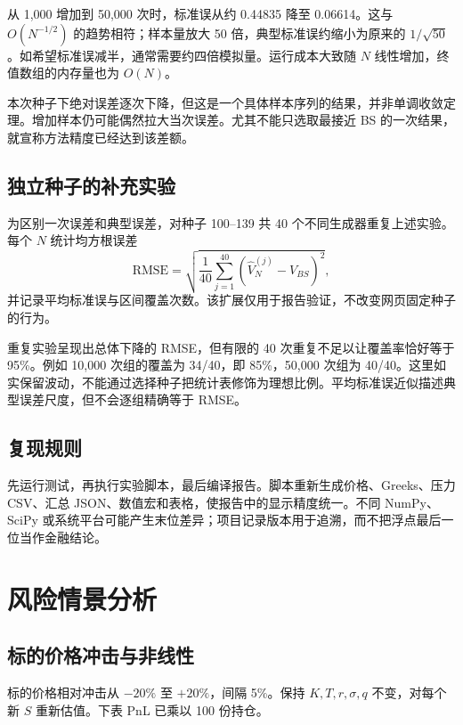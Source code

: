 \documentclass[UTF8,a4paper,12pt]{ctexart}
\begin{document}
\begin{table}[H]\centering\small

\caption{固定种子下的模拟次数比较}
\end{table}

从 1,000 增加到 50,000 次时，标准误从约 0.44835 降至 0.06614。这与 $O(N^{-1/2})$ 的趋势相符；样本量放大 50 倍，典型标准误约缩小为原来的 $1/\sqrt{50}$。如希望标准误减半，通常需要约四倍模拟量。运行成本大致随 $N$ 线性增加，终值数组的内存量也为 $O(N)$。

本次种子下绝对误差逐次下降，但这是一个具体样本序列的结果，并非单调收敛定理。增加样本仍可能偶然拉大当次误差。尤其不能只选取最接近 BS 的一次结果，就宣称方法精度已经达到该差额。

\subsection{独立种子的补充实验}
为区别一次误差和典型误差，对种子 100--139 共 40 个不同生成器重复上述实验。每个 $N$ 统计均方根误差
\[
\mathrm{RMSE}=\sqrt{\frac1{40}\sum_{j=1}^{40}(\widehat V_N^{(j)}-V_{BS})^2},
\]
并记录平均标准误与区间覆盖次数。该扩展仅用于报告验证，不改变网页固定种子的行为。

\begin{table}[H]\centering

\caption{40 个种子的重复实验；覆盖次数由实际结果统计}
\end{table}

重复实验呈现出总体下降的 RMSE，但有限的 40 次重复不足以让覆盖率恰好等于 95\%。例如 10,000 次组的覆盖为 34/40，即 85\%，50,000 次组为 40/40。这里如实保留波动，不能通过选择种子把统计表修饰为理想比例。平均标准误近似描述典型误差尺度，但不会逐组精确等于 RMSE。

\subsection{复现规则}
先运行测试，再执行实验脚本，最后编译报告。脚本重新生成价格、Greeks、压力 CSV、汇总 JSON、数值宏和表格，使报告中的显示精度统一。不同 NumPy、SciPy 或系统平台可能产生末位差异；项目记录版本用于追溯，而不把浮点最后一位当作金融结论。
\newpage

\section{风险情景分析}
\subsection{标的价格冲击与非线性}
标的价格相对冲击从 $-20\%$ 至 $+20\%$，间隔 5\%。保持 $K,T,r,\sigma,q$ 不变，对每个新 $S$ 重新估值。下表 PnL 已乘以 100 份持仓。
\end{document}
